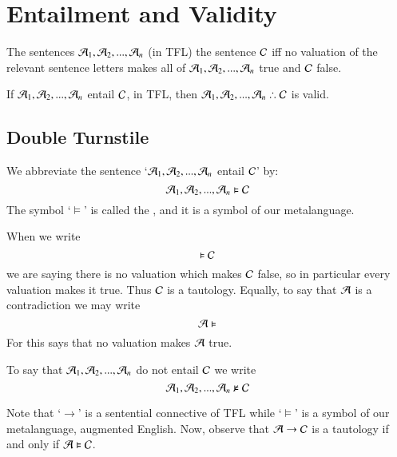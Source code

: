 \section{ Entailment and Validity}


\begin{definition}
    The sentences $\mathcal{A}_1,\mathcal{A}_2,...,\mathcal{A}_n$  (in TFL) the sentence $\mathcal{C}$ iff no valuation of the relevant sentence letters makes all of $\mathcal{A}_1,\mathcal{A}_2,...,\mathcal{A}_n$ true and $\mathcal{C}$ false.
\end{definition}

\begin{theorem}
    If $\mathcal{A}_1,\mathcal{A}_2,...,\mathcal{A}_n$ entail $\mathcal{C}$, in TFL, then $\metav{A}_1,\metav{A}_2,...,\metav{A}_n\therefore \metav{C}$ is valid.
\end{theorem}

\subsection{ Double Turnstile}

\begin{definition}
    We abbreviate the sentence `$\mathcal{A}_1,\mathcal{A}_2,...,\mathcal{A}_n$ entail $\mathcal{C}$' by:\begin{equation}
        \mathcal{A}_1,\mathcal{A}_2,...,\mathcal{A}_n\vDash\mathcal{C}
    \end{equation}
    The symbol `$\vDash$' is called the , and it is a symbol of our metalanguage.
\end{definition}

\begin{definition}
    When we write \begin{equation}
        \vDash\mathcal{C}
    \end{equation}
    we are saying there is no valuation which makes $\mathcal{C}$ false, so in particular every valuation makes it true. Thus $\mathcal{C}$ is a tautology. Equally, to say that $\mathcal{A}$ is a contradiction we may write \begin{equation}
        \mathcal{A}\vDash
    \end{equation}
    For this says that no valuation makes $\mathcal{A}$ true.
\end{definition}


\begin{definition}
    To say that $\mathcal{A}_1,\mathcal{A}_2,...,\mathcal{A}_n$ do not entail $\mathcal{C}$ we write \begin{equation}
        \mathcal{A}_1,\mathcal{A}_2,...,\mathcal{A}_n \nvDash \mathcal{C}
    \end{equation}
\end{definition}


\begin{remark}
    Note that `$\rightarrow$' is a sentential connective of TFL while `$\vDash$' is a symbol of our metalanguage, augmented English. Now, observe that $\mathcal{A} \rightarrow \mathcal{C}$ is a tautology if and only if $\mathcal{A} \vDash \mathcal{C}$.
\end{remark}



